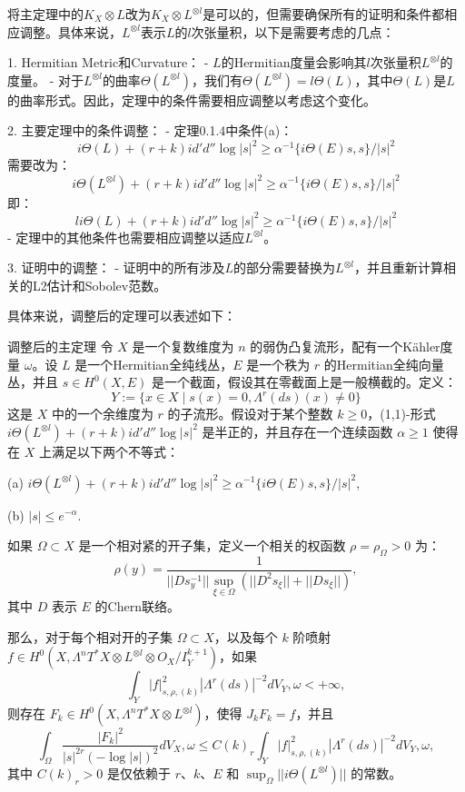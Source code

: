 \documentclass[lang=cn,12pt,a4paper,fontset=none]{beautybook}
\begin{document}
将主定理中的$K_X\otimes L$改为$K_X\otimes L^{\otimes l}$是可以的，但需要确保所有的证明和条件都相应调整。具体来说，$L^{\otimes l}$表示$L$的$l$次张量积，以下是需要考虑的几点：

1. Hermitian Metric和Curvature：
   - $L$的Hermitian度量会影响其$l$次张量积$L^{\otimes l}$的度量。
   - 对于$L^{\otimes l}$的曲率$\Theta(L^{\otimes l})$，我们有$\Theta(L^{\otimes l}) = l\Theta(L)$，其中$\Theta(L)$是$L$的曲率形式。因此，定理中的条件需要相应调整以考虑这个变化。

2. 主要定理中的条件调整：
   - 定理0.1.4中条件(a)：
     $$ i\Theta(L) + (r + k) id'd'' \log |s|^2 \geq α^{-1} \{i\Theta(E)s, s\}/|s|^2 $$
     需要改为：
     $$ i\Theta(L^{\otimes l}) + (r + k) id'd'' \log |s|^2 \geq α^{-1} \{i\Theta(E)s, s\}/|s|^2 $$
     即：
     $$ li\Theta(L) + (r + k) id'd'' \log |s|^2 \geq α^{-1} \{i\Theta(E)s, s\}/|s|^2 $$
   - 定理中的其他条件也需要相应调整以适应$L^{\otimes l}$。

3. 证明中的调整：
   - 证明中的所有涉及$L$的部分需要替换为$L^{\otimes l}$，并且重新计算相关的L2估计和Sobolev范数。

具体来说，调整后的定理可以表述如下：

调整后的主定理
令 $X$ 是一个复数维度为 $n$ 的弱伪凸复流形，配有一个Kähler度量 $\omega$。设 $L$ 是一个Hermitian全纯线丛，$E$ 是一个秩为 $r$ 的Hermitian全纯向量丛，并且 $s \in H^0(X, E)$ 是一个截面，假设其在零截面上是一般横截的。定义：
$$ Y := \{x \in X \mid s(x) = 0, \Lambda^r(ds)(x) \neq 0\} $$
这是 $X$ 中的一个余维度为 $r$ 的子流形。假设对于某个整数 $k \geq 0$，(1,1)-形式 $i\Theta(L^{\otimes l}) + (r+k) id'd'' \log |s|^2$ 是半正的，并且存在一个连续函数 $α \geq 1$ 使得在 $X$ 上满足以下两个不等式：

(a) \(i\Theta(L^{\otimes l}) + (r+k) id'd'' \log |s|^2 \geq α^{-1} \{i\Theta(E)s, s\}/|s|^2\),

(b) \(|s| \leq e^{-α}\).

如果 $\Omega \subset X$ 是一个相对紧的开子集，定义一个相关的权函数 \(\rho = \rho_\Omega > 0\) 为：
$$ \rho(y) = \frac{1}{||D s^{-1}_y|| \sup_{\xi \in \Omega} (||D^2 s_\xi|| + ||D s_\xi||)}, $$
其中 $D$ 表示 $E$ 的Chern联络。

那么，对于每个相对开的子集 $\Omega \subset X$，以及每个 $k$ 阶喷射 $f \in H^0(X, \Lambda^n T^* X \otimes L^{\otimes l} \otimes O_X / I^{k+1}_Y)$，如果
$$ \int_Y |f|^2_{s, \rho, (k)} |Λ^r(ds)|^{-2} dV_Y, \omega < +∞, $$
则存在 \(F_k \in H^0(X, \Lambda^n T^* X \otimes L^{\otimes l})\)，使得 \(J_k F_k = f\)，并且
$$ \int_\Omega \frac{|F_k|^2}{|s|^{2r} (-\log |s|)^2} dV_X, \omega \leq C(k)_r \int_Y |f|^2_{s, \rho, (k)} |Λ^r(ds)|^{-2} dV_Y, \omega, $$
其中 \(C(k)_r > 0\) 是仅依赖于 $r$、$k$、$E$ 和 $\sup_\Omega ||i\Theta(L^{\otimes l})||$ 的常数。
\end{document}
